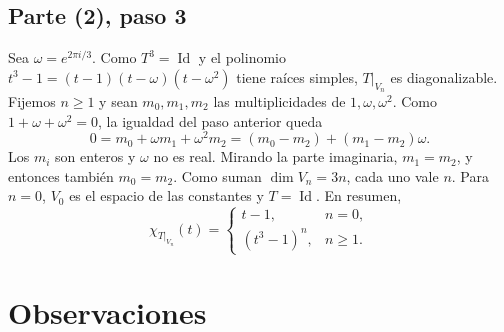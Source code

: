 \documentclass[11pt]{amsproc}
\newcommand{\Id}{\operatorname{Id}}
\begin{document}
\subsection*{Parte (2), paso 3}

Sea $\omega=e^{2\pi i/3}$. Como $T^3=\Id$ y el polinomio
$t^3-1=(t-1)(t-\omega)(t-\omega^2)$ tiene raíces simples, $T|_{V_n}$ es
diagonalizable. Fijemos $n\ge 1$ y sean $m_0,m_1,m_2$ las multiplicidades de
$1,\omega,\omega^2$. Como $1+\omega+\omega^2=0$, la igualdad del paso
anterior queda
\[
  0=m_0+\omega m_1+\omega^2m_2=(m_0-m_2)+(m_1-m_2)\omega.
\]
Los $m_i$ son enteros y $\omega$ no es real. Mirando la parte imaginaria,
$m_1=m_2$, y entonces también $m_0=m_2$. Como suman $\dim V_n=3n$, cada uno
vale $n$. Para $n=0$, $V_0$ es el espacio de las constantes y $T=\Id$. En
resumen,
\[
  \chi_{T|_{V_n}}(t)=
  \begin{cases}
    t-1,       & n=0,\\
    (t^3-1)^n, & n\ge 1.
  \end{cases}
\]

\section*{Observaciones}
\end{document}
